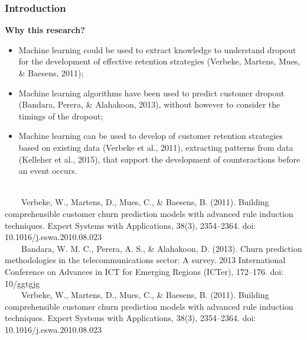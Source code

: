 \documentclass[10pt]{beamer}
\begin{document}
\begin{frame}
	\frametitle{Introduction}
	\Large
	\textbf{Why this research?}\\
		\begin{itemize} \normalsize
			\item Machine learning could be used to extract knowledge to understand dropout for the development of effective retention strategies \footnotesize(Verbeke, Martens, Mues, \& Baesens, 2011)\normalsize;
			\item Machine learning algorithms have been used to predict customer dropout \footnotesize(Bandara, Perera, \& Alahakoon, 2013)\normalsize, without however to consider the timings of the dropout;
			\item Machine learning can be used to develop of customer retention strategies based on existing data \footnotesize(Verbeke et al., 2011)\normalsize, extracting patterns from data \footnotesize(Kelleher et al., 2015)\normalsize, that support the development of counteractions before an event occurs. \\~\\
		\end{itemize}	
	\tiny
	~~~~Verbeke, W., Martens, D., Mues, C., \& Baesens, B. (2011). Building comprehensible customer churn prediction models with advanced rule induction techniques. Expert Systems with Applications, 38(3), 2354–2364. doi: 10.1016/j.eswa.2010.08.023 \\
	~~~~Bandara, W. M. C., Perera, A. S., \& Alahakoon, D. (2013). Churn prediction methodologies in the telecommunications sector: A survey. 2013 International Conference on Advances in ICT for Emerging Regions (ICTer), 172–176. doi: 10/ggtgjg\\
	~~~~Verbeke, W., Martens, D., Mues, C., \& Baesens, B. (2011). Building comprehensible customer churn prediction models with advanced rule induction techniques. Expert Systems with Applications, 38(3), 2354–2364. doi: 10.1016/j.eswa.2010.08.023\\
\end{frame}
\end{document}
